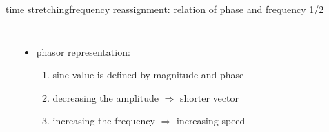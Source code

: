        \begin{frame}{time stretching}{frequency reassignment: relation of phase and frequency 1/2}
            \begin{columns}
            \vspace{-10mm}
            \begin{center}
            \end{center}
           \begin{itemize}
                \item   phasor representation:
                    \begin{enumerate}
                        \item   sine value is defined by magnitude and phase
                        \item   decreasing the amplitude $\Rightarrow$ shorter vector
                        \item   increasing the frequency $\Rightarrow$ increasing speed
                    \end{enumerate}
            \end{itemize}
            \end{columns}
        \end{frame}
